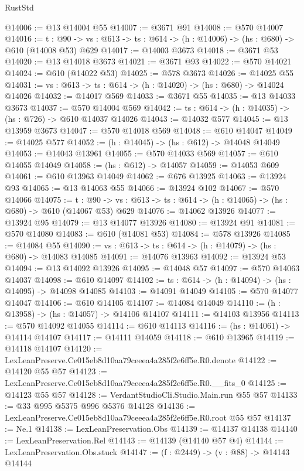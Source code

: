 \begin{lexlean}{RustStd}
\begin{coremodule}
@14006 := @13 @14004 @55
@14007 := @3671 @91
@14008 := @570 @14007
@14016 := {t : @90} ->
  {vs : @613} -> {ts : @614} -> (h : @14006) -> (hs : @680) -> @610 (@14008 @53) @629
@14017 := @14003 @3673
@14018 := @3671 @53
@14020 := @13 @14018 @3673
@14021 := @3671 @93
@14022 := @570 @14021
@14024 := @610 (@14022 @53)
@14025 := @578 @3673
@14026 := @14025 @55
@14031 := {vs : @613} -> {ts : @614} -> (h : @14020) -> (hs : @680) -> @14024 @14026
@14032 := @14017 @569
@14033 := @3671 @55
@14035 := @13 @14033 @3673
@14037 := @570 @14004 @569
@14042 := {ts : @614} -> (h : @14035) -> (hs : @726) -> @610 @14037 @14026
@14043 := @14032 @577
@14045 := @13 @13959 @3673
@14047 := @570 @14018 @569
@14048 := @610 @14047
@14049 := @14025 @577
@14052 := (h : @14045) -> (hs : @612) -> @14048 @14049
@14053 := @14043 @13961
@14055 := @570 @14033 @569
@14057 := @610 @14055 @14049
@14058 := (hs : @612) -> @14057
@14059 := @14053 @609
@14061 := @610 @13963 @14049
@14062 := @676 @13925
@14063 := @13924 @93
@14065 := @13 @14063 @55
@14066 := @13924 @102
@14067 := @570 @14066
@14075 := {t : @90} ->
  {vs : @613} -> {ts : @614} -> (h : @14065) -> (hs : @680) -> @610 (@14067 @53) @629
@14076 := @14062 @13926
@14077 := @13924 @95
@14079 := @13 @14077 @13926
@14080 := @13924 @91
@14081 := @570 @14080
@14083 := @610 (@14081 @53)
@14084 := @578 @13926
@14085 := @14084 @55
@14090 := {vs : @613} -> {ts : @614} -> (h : @14079) -> (hs : @680) -> @14083 @14085
@14091 := @14076 @13963
@14092 := @13924 @53
@14094 := @13 @14092 @13926
@14095 := @14048 @57
@14097 := @570 @14063 @14037
@14098 := @610 @14097
@14102 := {ts : @614} -> (h : @14094) -> (hs : @14095) -> @14098 @14085
@14103 := @14091 @14049
@14105 := @570 @14077 @14047
@14106 := @610 @14105
@14107 := @14084 @14049
@14110 := (h : @13958) -> (hs : @14057) -> @14106 @14107
@14111 := @14103 @13956
@14113 := @570 @14092 @14055
@14114 := @610 @14113
@14116 := (hs : @14061) -> @14114 @14107
@14117 := @14111 @14059
@14118 := @610 @13965
@14119 := @14118 @14107
@14120 := LexLeanPreserve.Ce015eb8d10aa79ceeea4a285f2e6ff5e.R0.denote
@14122 := @14120 @55 @57
@14123 := LexLeanPreserve.Ce015eb8d10aa79ceeea4a285f2e6ff5e.R0.__fits_0
@14125 := @14123 @55 @57
@14128 := VerdantStudioCli.Studio.Main.run @55 @57
@14133 := @33 @995 @5375 @996 @5376 @14128
@14136 := LexLeanPreserve.Ce015eb8d10aa79ceeea4a285f2e6ff5e.R0.root @55 @57
@14137 := Ne.{1}
@14138 := LexLeanPreservation.Obs
@14139 := @14137 @14138
@14140 := LexLeanPreservation.Rel
@14143 := @14139 (@14140 @57 @4)
@14144 := LexLeanPreservation.Obs.stuck
@14147 := (f : @2449) -> (v : @88) -> @14143 @14144

\end{coremodule}
\end{lexlean}
